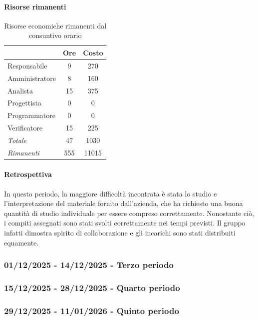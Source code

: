 \documentclass[a4paper,12pt]{article}
\begin{document}
            \paragraph{Risorse rimanenti}
                \begin{table}[H]
                \centering
                \begin{tabular}{|l|c|c|}
                \hline
                    \rowcolor{lightgray}{\textbf{Ruolo}} & {\textbf{Ore}} & {\textbf{Costo}}\\
                \hline
                    Responsabile & 9 & 270\\
                \hline
                    Amministratore & 8 & 160\\
                \hline
                    Analista & 15 & 375\\
                \hline
                    Progettista & 0 & 0\\
                \hline
                    Programmatore & 0 & 0\\
                \hline
                    Verificatore & 15 & 225\\
                \hline
                    \rowcolor{lightgray}\textit{Totale} & 47 & 1030\\
                \hline
                    \rowcolor{lightgray}\textit{Rimanenti} & 555 & 11015\\
                \hline
                \end{tabular}
                \caption{Risorse economiche rimanenti dal consuntivo orario}
                \end{table}
                
            \paragraph{Retrospettiva}
            In questo periodo, la maggiore difficoltà incontrata è stata lo studio e l'interpretazione del materiale fornito dall'azienda, che ha richiesto una buona quantità di studio individuale per essere compreso correttamente. Nonostante ciò, i compiti assegnati sono stati svolti correttamente nei tempi previsti. Il gruppo infatti dimostra spirito di collaborazione e gli incarichi sono stati distribuiti equamente.

        \subsubsection{01/12/2025 - 14/12/2025 - Terzo periodo}

        \subsubsection{15/12/2025 - 28/12/2025 - Quarto periodo}

        \subsubsection{29/12/2025 - 11/01/2026 - Quinto periodo}
    
\end{document}

